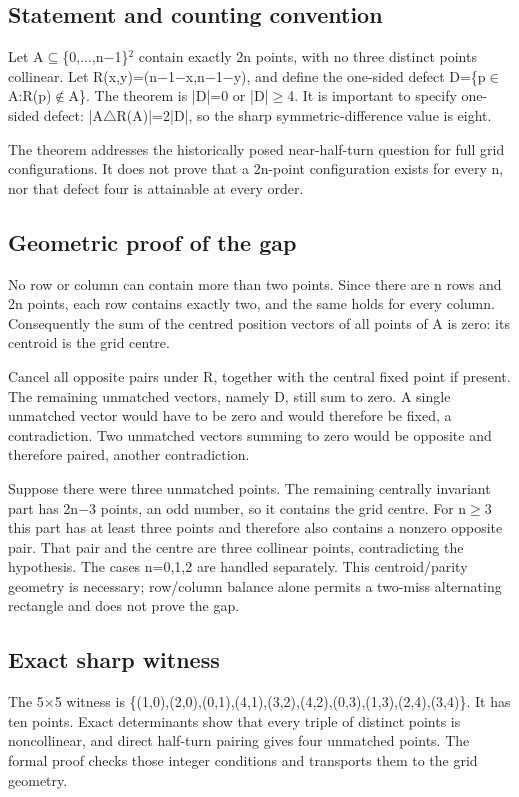 \documentclass[11pt,a4paper]{article}
\begin{document}
\subsection{Statement and counting convention}
Let A\ensuremath{\subseteq}\{0,...,n\ensuremath{-}1\}\ensuremath{^2} contain exactly 2n points, with no three distinct points collinear. Let R(x,y)=(n\ensuremath{-}1\ensuremath{-}x,n\ensuremath{-}1\ensuremath{-}y), and define the one-sided defect D=\{p\ensuremath{\in}A:R(p)\ensuremath{\notin}A\}. The theorem is |D|=0 or |D|\ensuremath{\geq}4. It is important to specify one-sided defect: |A\ensuremath{\triangle}R(A)|=2|D|, so the sharp symmetric-difference value is eight.

The theorem addresses the historically posed near-half-turn question for full grid configurations. It does not prove that a 2n-point configuration exists for every n, nor that defect four is attainable at every order.

\subsection{Geometric proof of the gap}
No row or column can contain more than two points. Since there are n rows and 2n points, each row contains exactly two, and the same holds for every column. Consequently the sum of the centred position vectors of all points of A is zero: its centroid is the grid centre.

Cancel all opposite pairs under R, together with the central fixed point if present. The remaining unmatched vectors, namely D, still sum to zero. A single unmatched vector would have to be zero and would therefore be fixed, a contradiction. Two unmatched vectors summing to zero would be opposite and therefore paired, another contradiction.

Suppose there were three unmatched points. The remaining centrally invariant part has 2n\ensuremath{-}3 points, an odd number, so it contains the grid centre. For n\ensuremath{\geq}3 this part has at least three points and therefore also contains a nonzero opposite pair. That pair and the centre are three collinear points, contradicting the hypothesis. The cases n=0,1,2 are handled separately. This centroid/parity geometry is necessary; row/column balance alone permits a two-miss alternating rectangle and does not prove the gap.

\subsection{Exact sharp witness}
The 5\ensuremath{\times}5 witness is \{(1,0),(2,0),(0,1),(4,1),(3,2),(4,2),(0,3),(1,3),(2,4),(3,4)\}. It has ten points. Exact determinants show that every triple of distinct points is noncollinear, and direct half-turn pairing gives four unmatched points. The formal proof checks those integer conditions and transports them to the grid geometry.
\end{document}
